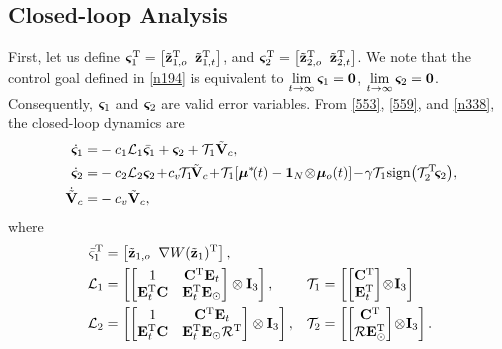 \subsection{Closed-loop Analysis}

First, let us define $\bm{\varsigma}_1^{\mathrm{T}} = \left[\tilde{\mathbf{z}}_{1, o}^{\mathrm{T}}\;\;\tilde{\mathbf{z}}_{1, t}^{\mathrm{T}}\right]$, and $\bm{\varsigma}_2^{\mathrm{T}}=\left[\tilde{\mathbf{z}}_{2, o}^{\mathrm{T}}\;\;\tilde{\mathbf{z}}_{2, t}^{\mathrm{T}}\right]$.
We note that the control goal defined in \eqref{n194} is equivalent to $\lim\limits_{t \rightarrow \infty} \bm{\varsigma}_1 = \mathbf{0}$, $\lim\limits_{t \rightarrow \infty} \bm{\varsigma}_2 = \mathbf{0}$.
Consequently, $\bm{\varsigma}_1$ and $\bm{\varsigma}_2$ are valid error variables.
From \eqref{553}, \eqref{559}, and \eqref{n338}, the closed-loop dynamics are
\begin{subequations}\label{n560}\begin{align}
	\dot{\bs{\varsigma}}_1 =& -c_1\mathcal{L}_1\bar{\bs{\varsigma}}_1+\bs{\varsigma}_2+\mathcal{T}_1\tilde{\mat{V}}_c, \label{n560-a}\\
	\dot{\bs{\varsigma}}_2 =& -c_2\mathcal{L}_2\bs{\varsigma}_{2\!}+\!c_{v\!}\mathcal{T}_1\!\tilde{\mat{V}}_c\!+\!\mathcal{T}_1\!\left[\bs{\mu}^*\!(t)-\mathbf{1}_{N}\!\otimes\!\bs{\mu}_o(t)\right]\!-\!\gamma\mathcal{T}_1{\rm sign}\!\left(\mathcal{T}_2\T\!\bs{\varsigma}_2\right)\!\mathrlap{,}\label{n560-b}\\
	\dot{\tilde{\mat{V}}}_c =& -c_v\tilde{\mat{V}}_c, \label{n560-c}
\end{align}\end{subequations}	
where
\begin{subequations} \label{570} \begin{align}
	\bar\varsigma_1^{\mathrm{T}} &= \left[\tilde{\mathbf{z}}_{1, o}\;\;\nabla W(\tilde{\mathbf{z}}_{1})^{\mathrm{T}} \right], & & \label{570-a} \\
	\mathcal{L}_1&=\left[\left[\begin{matrix}
		1&\mathbf{C}^{\mathrm{T}} \mathbf{E}_t\\\mathbf{E}_t^{\mathrm{T}} \mathbf{C}&\mathbf{E}_t^{\mathrm{T}} \mathbf{E}_\odot
		\end{matrix}\right]\otimes \mathbf{I}_3\right],& 
		\mathcal{T}_1 &=\left[\left[\begin{matrix}
		\mathbf{C}^{\mathrm{T}}\\\mathbf{E}_t^{\mathrm{T}}
		\end{matrix}\right]\!\otimes\! \mathbf{I}_3\right] \label{570-b} \\
		\mathcal{L}_2&=\left[\left[\begin{matrix}
		1&\mathbf{C}^{\mathrm{T}} \mathbf{E}_t\\\mathbf{E}_t^{\mathrm{T}} \mathbf{C}&\mathbf{E}_t^{\mathrm{T}} \mathbf{E}_\odot \mathcal{R}^{\mathrm{T}}
		\end{matrix}\right]\otimes \mathbf{I}_3\right],&
		\mathcal{T}_2&=\left[\left[\begin{matrix}
		\mathbf{C}^{\mathrm{T}}\\\mathcal{R} \mathbf{E}_\odot^{\mathrm{T}}
		\end{matrix}\right]\!\otimes\! \mathbf{I}_3\right]. \label{570-c}
\end{align} \end{subequations}

